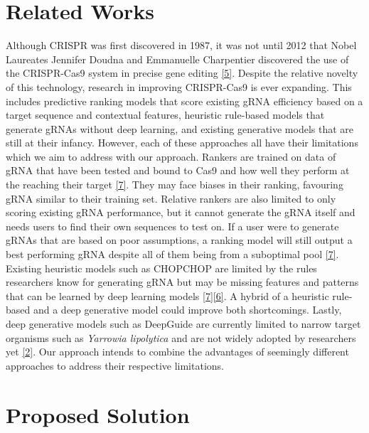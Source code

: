 \documentclass{article}
\begin{document}
\section{Related Works}
Although CRISPR was first discovered in 1987, it was not until 2012 that Nobel Laureates Jennifer Doudna and Emmanuelle Charpentier discovered the use of the CRISPR-Cas9 system in precise gene editing \hyperref[Reference 5]{[5]}. Despite the relative novelty of this technology, research in improving CRISPR-Cas9 is ever expanding. This includes predictive ranking models that score existing gRNA efficiency based on a target sequence and contextual features, heuristic rule-based models that generate gRNAs without deep learning, and existing generative models that are still at their infancy. However, each of these approaches all have their limitations which we aim to address with our approach. Rankers are trained on data of gRNA that have been tested and bound to Cas9 and how well they perform at the reaching their target \hyperref[Reference 7]{[7]}. They may face biases in their ranking, favouring gRNA similar to their training set. Relative rankers are also limited to only scoring existing gRNA performance, but it cannot generate the gRNA itself and needs users to find their own sequences to test on. If a user were to generate gRNAs that are based on poor assumptions, a ranking model will still output a best performing gRNA despite all of them being from a suboptimal pool \hyperref[Reference 7]{[7]}. Existing heuristic models such as CHOPCHOP are limited by the rules researchers know for generating gRNA but may be missing features and patterns that can be learned by deep learning models \hyperref[Reference 7]{[7]}\hyperref[Reference 6]{[6]}. A hybrid of a heuristic rule-based and a deep generative model could improve both shortcomings. Lastly, deep generative models such as DeepGuide are currently limited to narrow target organisms such as \textit{Yarrowia lipolytica} and are not widely adopted by researchers yet \hyperref[Reference 2]{[2]}. Our approach intends to combine the advantages of seemingly different approaches to address their respective limitations.


\section{Proposed Solution}
\end{document}
